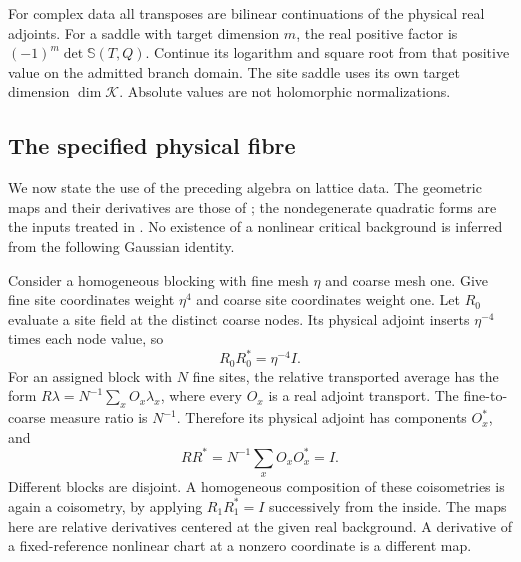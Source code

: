 \documentclass[11pt,letterpaper,reqno]{amsart}
\numberwithin{equation}{section}
\theoremstyle{definition}
\theoremstyle{remark}
\begin{document}
For complex data all transposes are bilinear continuations
of the physical real adjoints. For a saddle with target dimension $m$, the real positive factor
is $(-1)^m\det\mathbb S(T,Q)$. Continue its logarithm and
square root from that positive value on the admitted branch
domain. The site saddle uses its own target dimension
$\dim\mathcal K$. Absolute values are not holomorphic
normalizations.

\subsection{The specified physical fibre}

We now state the use of the preceding algebra on lattice data.
The geometric maps and their derivatives are those of
\cite{BA}; the nondegenerate quadratic forms are the inputs
treated in \cite{MB}. No existence of a nonlinear critical
background is inferred from the following Gaussian identity.

Consider a homogeneous blocking with fine mesh $\eta$ and
coarse mesh one. Give fine site coordinates weight $\eta^4$
and coarse site coordinates weight one. Let $R_0$ evaluate
a site field at the distinct coarse nodes. Its physical
adjoint inserts $\eta^{-4}$ times each node value, so
\begin{equation}\label{gi:eq-node-coarea}
                         R_0R_0^*=\eta^{-4}I.
\end{equation}
For an assigned block with $N$ fine sites, the relative
transported average has the form
$R\lambda=N^{-1}\sum_x O_x\lambda_x$, where every $O_x$
is a real adjoint transport. The fine-to-coarse measure
ratio is $N^{-1}$. Therefore its physical adjoint has
components $O_x^*$, and
\begin{equation}\label{gi:eq-site-coisometry}
                       RR^*=N^{-1}\sum_x O_xO_x^*=I.
\end{equation}
Different blocks are disjoint. A homogeneous composition
of these coisometries is again a coisometry, by applying
$R_1R_1^*=I$ successively from the inside. The maps here
are relative derivatives centered at the given real
background. A derivative of a fixed-reference nonlinear
chart at a nonzero coordinate is a different map.
\end{document}
